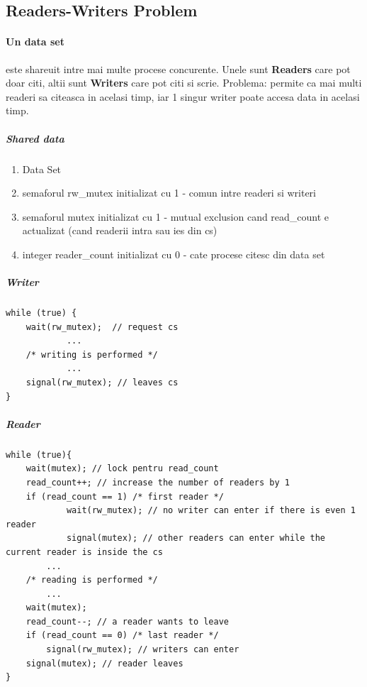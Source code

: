 \documentclass{article}
\begin{document}
\subsection*{Readers-Writers Problem}
\paragraph*{Un data set} este shareuit intre mai multe procese concurente. Unele sunt \textbf{Readers} care pot doar citi, altii sunt \textbf{Writers} care pot citi si scrie. Problema: permite ca mai multi readeri sa citeasca in acelasi timp, iar 1 singur writer poate accesa data in acelasi timp.

\subparagraph*{Shared data}
\begin{enumerate}
    \item Data Set
    \item semaforul rw\_mutex initializat cu 1 - comun intre readeri si writeri
    \item semaforul mutex initializat cu 1 - mutual exclusion cand read\_count e actualizat (cand readerii intra sau ies din cs)
    \item integer reader\_count initializat cu 0 - cate procese citesc din data set
\end{enumerate}

\subparagraph*{Writer}
\begin{center}
    \begin{lstlisting}
while (true) {
    wait(rw_mutex);  // request cs
            ...
    /* writing is performed */ 
            ... 
    signal(rw_mutex); // leaves cs
}
    \end{lstlisting}
\end{center}

\subparagraph*{Reader}
\begin{center}
    \begin{lstlisting}
while (true){
    wait(mutex); // lock pentru read_count
    read_count++; // increase the number of readers by 1
    if (read_count == 1) /* first reader */ 
            wait(rw_mutex); // no writer can enter if there is even 1 reader
            signal(mutex); // other readers can enter while the current reader is inside the cs
        ...
    /* reading is performed */ 
        ... 
    wait(mutex);
    read_count--; // a reader wants to leave
    if (read_count == 0) /* last reader */
        signal(rw_mutex); // writers can enter
    signal(mutex); // reader leaves
}
    \end{lstlisting}
\end{center}
\end{document}
